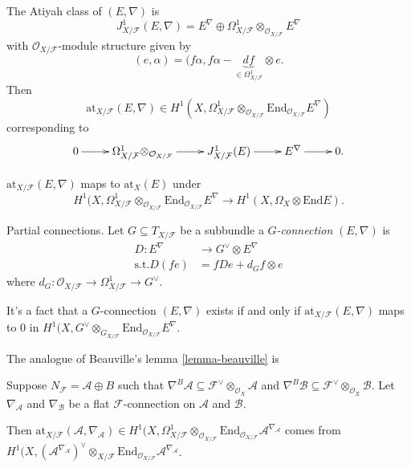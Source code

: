 The Atiyah class of $(E,\nabla)$ is
$$
J^1_{X/\mathcal{F}}(E,\nabla)=E^{\nabla}
\oplus
\Omega_{X/\mathcal{F}}^1
\otimes_{\mathcal{O}_{X/\mathcal{F}}}
E^{\nabla}
$$
with $\mathcal{O}_{X/\mathcal{F}}$-module
structure given by
 $$
(e,\alpha)=(f\alpha,f\alpha-\underbrace{df}
_{\in
\Omega^1_{X/\mathcal{F}}}
\otimes e.
$$
Then
$$
\text{at}_{X/\mathcal{F}}(E,\nabla)
\in
H^1(X,\Omega_{X/\mathcal{F}}
^1\otimes_{\mathcal{O}_{X/\mathcal{F}}}
\text{End}_{\mathcal{O}_{X/\mathcal{F}}}
E^{\nabla})
$$
corresponding to
$$
\xymatrix{
0\ar[r]&\Omega_{X/\mathcal{F}}
^1\otimes_{\mathcal{O}_{X/\mathcal{F}}}\ar[r]
&J_{X/\mathcal{F}}^1(E)\ar[r]&E^{\nabla}
\ar[r]&0.
}
$$

\begin{lemma}
\label{lemma-atiya-class-maps-atiya-class}
$\text{at}_{X/\mathcal{F}}(E,\nabla)$ maps to
$\text{at}_X(E)$ under
$$
H^1(X,\Omega_{X/\mathcal{F}}
^1\otimes_{\mathcal{O}_{X/\mathcal{F}}}
\text{End}_{\mathcal{O}_{X/\mathcal{F}}}
E^{\nabla}
\to H^1(X,\Omega_X \otimes \text{End}E).
$$
\end{lemma}

\noindent
Partial connections. Let $G \subseteq
T_{X/\mathcal{F}}$
be a subbundle a {\it $G$-connection}
$(E,\nabla)$ is
$$
\begin{aligned}
D: E^{\nabla} &\longrightarrow G^\vee\otimes
E^{\nabla} \\
\text{s.t.} D(fe)&=fDe+d_Gf\otimes e
\end{aligned}
$$
where
$d_G:\mathcal{O}_{X/\mathcal{F}}\to\Omega_{X/
\mathcal{F}}^1\to
G^\vee$.

It's a fact that a $G$-connection
$(E,\nabla)$ exists if and only if
$\text{at}_{X/\mathcal{F}}(E,\nabla)$ maps to
0 in
$H^1(X,G^\vee
\otimes_{G_{X/\mathcal{F}}}\text{End}
_{\mathcal{O}_{X/\mathcal{F}}}
E^{\nabla}$.

The analogue of Beauville's lemma
\ref{lemma-beauville} is

\begin{lemma}[Beauville]
\label{lemma-analogue-beauville}
Suppose $N_{\mathcal{F}}=\mathcal{A} \oplus
B$ such that
$\nabla^B\mathcal{A} \subseteq
\mathcal{F}^\vee
\otimes_{\mathcal{O}_X}\mathcal{A}$
and $\nabla^B \mathcal{B} \subseteq
\mathcal{F}^\vee\otimes_{\mathcal{O}_X}
\mathcal{B}$.
Let $\nabla_{\mathcal{A}}$ and
$\nabla_{\mathcal{B}}$ be a flat
 $\mathcal{F}$-connection on $\mathcal{A}$
 and $\mathcal{B}$.

Then
$\text{at}_{X/\mathcal{F}}(\mathcal{A},
\nabla_{\mathcal{A}})
\in
H^1(X,\Omega_{X/\mathcal{F}}
^1\otimes_{\mathcal{O}_{X/\mathcal{F}}}
\text{End}_{\mathcal{O}_{X/\mathcal{F}}}
\mathcal{A}^{\nabla_{\mathcal{A}}}$
comes from
$H^1(X,(\mathcal{A}^{\nabla_{\mathcal{A}}})
^\vee
\otimes_{X/\mathcal{F}}\text{End}
_{\mathcal{O}_{X/\mathcal{F}}}\mathcal{A}
^{\nabla_{\mathcal{A}}}$.
\end{lemma}

